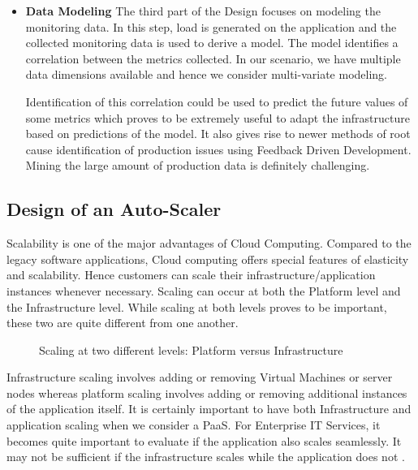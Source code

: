 \documentclass[article,type=msc,colorback,12pt,accentcolor=tud7b,table]{tudthesis}
\begin{document}
\begin{itemize}
	 	\item {\textbf{Data Modeling}} 
	 	\newline The third part of the Design focuses on modeling the monitoring data. In this step, load is generated on the application and the collected monitoring data is used to derive a model. The model identifies a correlation between the metrics collected. In our scenario, we have multiple data dimensions available and hence we consider multi-variate modeling.
	 	
	 	\par Identification of this correlation could be used to predict the future values of some metrics which proves to be extremely useful to adapt the infrastructure based on predictions of the model. It also gives rise to newer methods of root cause identification of production issues using Feedback Driven Development. Mining the large amount of production data is definitely challenging.
 	 	
 	 \end{itemize}
 	
 	\subsection{Design of an Auto-Scaler}
 	
 	Scalability is one of the major advantages of Cloud Computing. Compared to the legacy software applications, Cloud computing offers special features of elasticity and scalability. Hence customers can scale their infrastructure/application instances whenever necessary. Scaling can occur at both the Platform level and the Infrastructure level. While scaling at both levels proves to be important, these two are quite different from one another. 
 	
 	 \begin{figure}[!h]
 	 	\begin{center}
 	 		\makebox[\textwidth]{\texttt{[image: C3]}}
 	 	\end{center}
 	 	\caption{Scaling at two different levels: Platform versus Infrastructure}
 	 \end{figure}
 	
 	Infrastructure scaling involves adding or removing Virtual Machines or server nodes whereas platform scaling involves adding or removing additional instances of the application itself. It is certainly important to have both Infrastructure and application scaling when we consider a PaaS. For Enterprise IT Services, it becomes quite important to evaluate if the application also scales seamlessly. It may not be sufficient if the infrastructure scales while the application does not \cite{app_infra_scale}. 
 	
\end{document}
